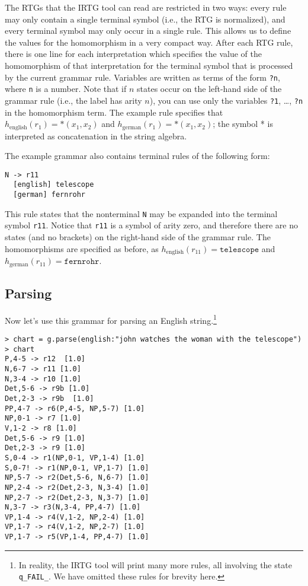 \documentclass[11pt]{article}
\begin{document}
The RTGs that the IRTG tool can read are restricted in two ways: every
rule may only contain a single terminal symbol (i.e., the RTG is
normalized), and every terminal symbol may only occur in a single
rule.  This allows us to define the values for the homomorphism in a
very compact way.  After each RTG rule, there is one line for each
interpretation which specifies the value of the homomorphism of that
interpretation for the terminal symbol that is processed by the
current grammar rule.  Variables are written as terms of the form
\texttt{?n}, where \verb?n? is a number. Note that if $n$ states occur
on the left-hand side of the grammar rule (i.e., the label has arity
$n$), you can use only the variables \texttt{?1}, \ldots, \texttt{?n}
in the homomorphism term. The example rule specifies that
$h_\mathrm{english}(r_1) = *(x_1,x_2)$ and $h_\mathrm{german}(r_1) =
*(x_1,x_2)$; the symbol * is interpreted as concatenation in the
string algebra.

The example grammar also contains terminal rules of the following
form:

\begin{verbatim}
N -> r11
  [english] telescope
  [german] fernrohr
\end{verbatim}

This rule states that the nonterminal \verb?N? may be expanded into
the terminal symbol \verb?r11?. Notice that \verb?r11?  is a symbol of
arity zero, and therefore there are no states (and no brackets) on the
right-hand side of the grammar rule. The homomorphisms are specified as
before, as $h_\mathrm{english}(r_{11}) = \mathtt{telescope}$ and
$h_\mathrm{german}(r_{11}) = \mathtt{fernrohr}$.


\subsection{Parsing}

Now let's use this grammar for parsing an English string.\footnote{In
  reality, the IRTG tool will print many more rules, all involving the
  state \texttt{q\_FAIL\_}. We have omitted these rules for brevity here.}

\begin{verbatim}
> chart = g.parse(english:"john watches the woman with the telescope")
> chart
P,4-5 -> r12  [1.0]
N,6-7 -> r11 [1.0]
N,3-4 -> r10 [1.0]
Det,5-6 -> r9b [1.0]
Det,2-3 -> r9b  [1.0]
PP,4-7 -> r6(P,4-5, NP,5-7) [1.0]
NP,0-1 -> r7 [1.0]
V,1-2 -> r8 [1.0]
Det,5-6 -> r9 [1.0]
Det,2-3 -> r9 [1.0]
S,0-4 -> r1(NP,0-1, VP,1-4) [1.0]
S,0-7! -> r1(NP,0-1, VP,1-7) [1.0]
NP,5-7 -> r2(Det,5-6, N,6-7) [1.0]
NP,2-4 -> r2(Det,2-3, N,3-4) [1.0]
NP,2-7 -> r2(Det,2-3, N,3-7) [1.0]
N,3-7 -> r3(N,3-4, PP,4-7) [1.0]
VP,1-4 -> r4(V,1-2, NP,2-4) [1.0]
VP,1-7 -> r4(V,1-2, NP,2-7) [1.0]
VP,1-7 -> r5(VP,1-4, PP,4-7) [1.0]
\end{verbatim}
\end{document}
